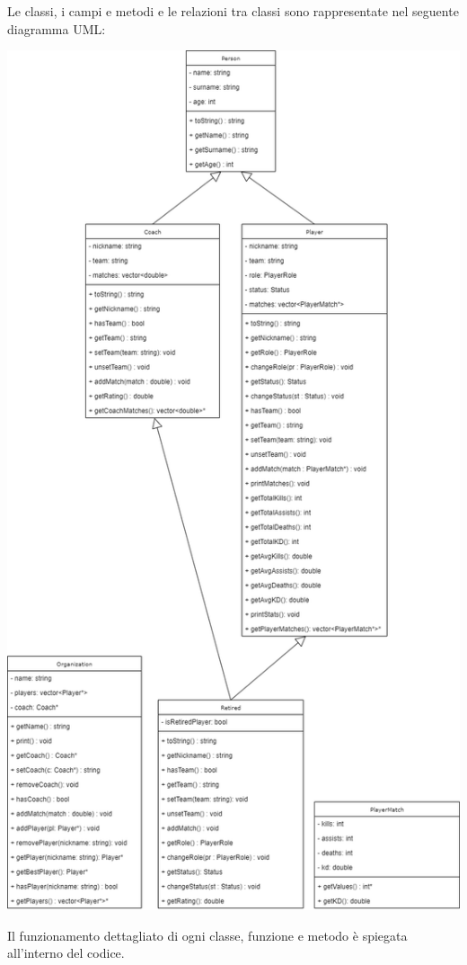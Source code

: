 \documentclass[a4paper, 11pt]{article}
\begin{document}
Le classi, i campi e metodi e le relazioni tra classi sono rappresentate nel seguente diagramma UML:

\begin{center}
\includegraphics[height=\textheight]{uml}
\end{center}

Il funzionamento dettagliato di ogni classe, funzione e metodo è spiegata all'interno del codice.
\end{document}
